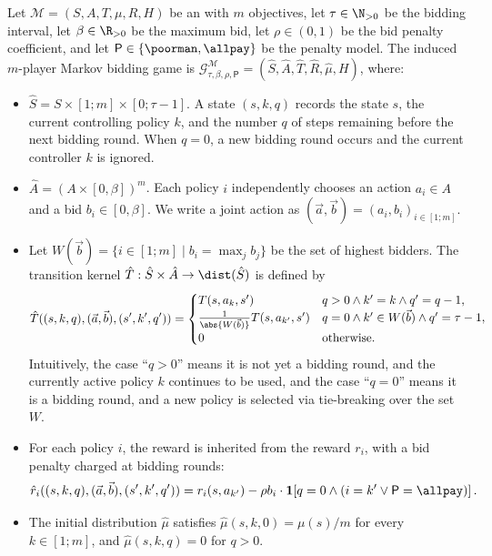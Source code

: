 \begin{definition}\label{def:markov-bidding-game}
	Let \(\mathcal{M}=(S,A,T,\mu,R,H)\) be an \momdp with \(m\) objectives, let \(\tau\in\N_{>0}\) be the bidding interval, let \(\beta\in\R_{>0}\) be the maximum bid, let \(\rho\in(0,1)\) be the bid penalty coefficient, and let \(\mathsf{P}\in\{\poorman,\allpay\}\) be the penalty model.
	The induced \(m\)-player Markov bidding game is \(\mathcal{G}^{\mathcal{M}}_{\tau,\beta,\rho,\mathsf{P}}=(\hat S,\hat A,\hat T,\hat R,\hat\mu,H)\), where:
	\begin{itemize}
		\item \(\hat S=S\times [1;m]\times [0;\tau-1]\). A state \((s,k,q)\) records the \momdp state \(s\), the current controlling policy \(k\), and the number \(q\) of steps remaining before the next bidding round. When \(q=0\), a new bidding round occurs and the current controller \(k\) is ignored.
		\item \(\hat A=(A\times [0,\beta])^m\). Each policy \(i\) independently chooses an action \(a_i\in A\) and a bid \(b_i\in[0,\beta]\). We write a joint action as \((\vec a,\vec b)=(a_i,b_i)_{i\in[1;m]}\).
		\item Let \(W(\vec b)=\{i\in[1;m]\mid b_i=\max_j b_j\}\) be the set of highest bidders. The transition kernel \(\hat T:\hat S\times\hat A\to\dist(\hat S)\) is defined by
		\begin{equation}
			\hat T((s,k,q),(\vec a,\vec b),(s',k',q'))=
			\begin{cases}
				T(s,a_k,s') & q>0 \land k'=k \land q'=q-1,\\
				\frac{1}{\abs{W(\vec b)}}T(s,a_{k'},s') & q=0 \land k'\in W(\vec b)\land q'=\tau-1,\\
				0 & \text{otherwise}.
			\end{cases}
		\end{equation}
		Intuitively, the case ``$q>0$'' means it is not yet a bidding round, and the currently active policy $k$ continues to be used, and the case ``$q=0$'' means it is a bidding round, and a new policy is selected via tie-breaking over the set $W$.
		\item For each policy \(i\), the reward is inherited from the \momdp reward \(r_i\), with a bid penalty charged at bidding rounds:
		\begin{equation}
			\hat r_i((s,k,q),(\vec a,\vec b),(s',k',q'))
			=
			r_i(s,a_{k'})
			-
			\rho b_i\cdot \mathbf{1}\!\left[q=0\land (i=k'\lor \mathsf{P}=\allpay)\right].
		\end{equation}
		\item The initial distribution \(\hat\mu\) satisfies \(\hat\mu(s,k,0)=\mu(s)/m\) for every \(k\in[1;m]\), and \(\hat\mu(s,k,q)=0\) for \(q>0\).
	\end{itemize}
\end{definition}

